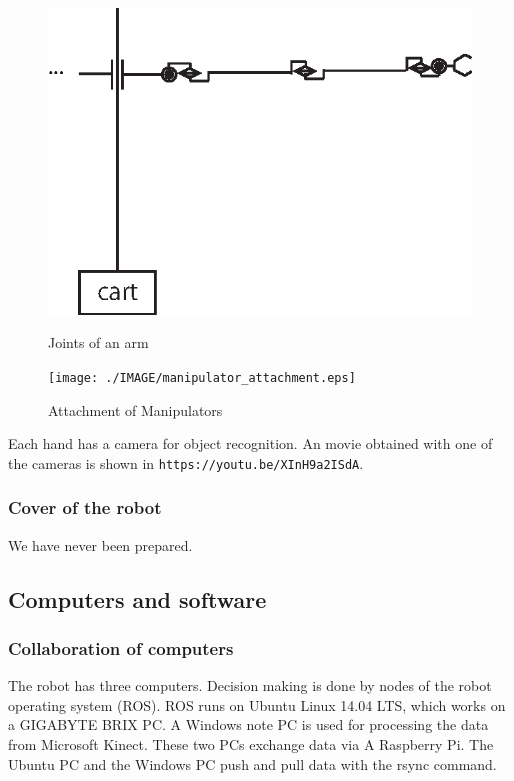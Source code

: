 \documentclass{llncs}
\begin{document}
\begin{figure}[h]
\begin{minipage}{23em}
	\begin{center}
		\includegraphics[width=0.95\linewidth]{./IMAGE/joints.eps}
		\caption{Joints of an arm}
		\label{fig:joints}
	\end{center}
\end{minipage}
\begin{minipage}{15em}
	\begin{center}
		\texttt{[image: ./IMAGE/manipulator\_attachment.eps]}
		\caption{Attachment of Manipulators}
		\label{fig:manipulator_attachment}
\end{center}
\end{minipage}
\end{figure}

Each hand has a camera for object recognition.
An movie obtained with one of the cameras is shown in
\texttt{https://youtu.be/XInH9a2ISdA}.


\subsubsection{Cover of the robot} We have never been prepared.

\subsection{Computers and software}

\subsubsection{Collaboration of computers}
The robot has three computers. Decision making is done by
nodes of the robot operating system (ROS).
ROS runs on Ubuntu Linux 14.04 LTS, which works on
a GIGABYTE BRIX PC. A Windows note PC is used for processing
the data from Microsoft Kinect.
These two PCs exchange data via A Raspberry Pi.
The Ubuntu PC and the Windows PC push and pull
data with the rsync command.
\end{document}
